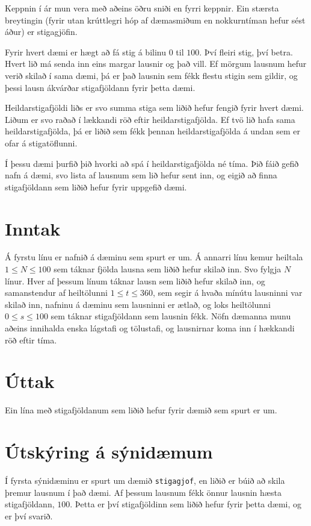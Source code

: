 
Keppnin í ár mun vera með aðeins öðru sniði en fyrri keppnir. Ein stærsta
breytingin (fyrir utan krúttlegri hóp af dæmasmiðum en nokkurntíman hefur sést
áður) er stigagjöfin.

Fyrir hvert dæmi er hægt að fá stig á bilinu $0$ til $100$. Því fleiri stig,
því betra. Hvert lið má senda inn eins margar lausnir og það vill. Ef mörgum
lausnum hefur verið skilað í sama dæmi, þá er það lausnin sem fékk flestu
stigin sem gildir, og þessi lausn ákvárðar stigafjöldann fyrir þetta dæmi.

Heildarstigafjöldi liðs er svo summa stiga sem liðið hefur fengið fyrir hvert
dæmi. Liðum er svo raðað í lækkandi röð eftir heildarstigafjölda. Ef tvö lið
hafa sama heildarstigafjölda, þá er liðið sem fékk þennan heildarstigafjölda á
undan sem er ofar á stigatöflunni.

Í þessu dæmi þurfið þið hvorki að spá í heildarstigafjölda né tíma. Þið fáið
gefið nafn á dæmi, svo lista af lausnum sem lið hefur sent inn, og eigið að
finna stigafjöldann sem liðið hefur fyrir uppgefið dæmi.

\section*{Inntak}
Á fyrstu línu er nafnið á dæminu sem spurt er um. Á annarri línu kemur heiltala
$1 \leq N \leq 100$ sem táknar fjölda lausna sem liðið hefur skilað inn. Svo
fylgja $N$ línur. Hver af þessum línum táknar lausn sem liðið hefur skilað inn,
og samanstendur af heiltölunni $1 \leq t\leq 360$, sem segir á hvaða mínútu
lausninni var skilað inn, nafninu á dæminu sem lausninni er ætlað, og loks
heiltölunni $0 \leq s\leq 100$ sem táknar stigafjöldann sem lausnin fékk. Nöfn
dæmanna munu aðeins innihalda enska lágstafi og tölustafi, og lausnirnar
koma inn í hækkandi röð eftir tíma.

\section*{Úttak}
Ein lína með stigafjöldanum sem liðið hefur fyrir dæmið sem spurt er um.

\section*{Útskýring á sýnidæmum}
Í fyrsta sýnidæminu er spurt um dæmið \texttt{stigagjof}, en liðið er búið að
skila þremur lausnum í það dæmi. Af þessum lausnum fékk önnur lausnin hæsta
stigafjöldann, $100$. Þetta er því stigafjöldinn sem liðið hefur fyrir þetta
dæmi, og er því svarið.

